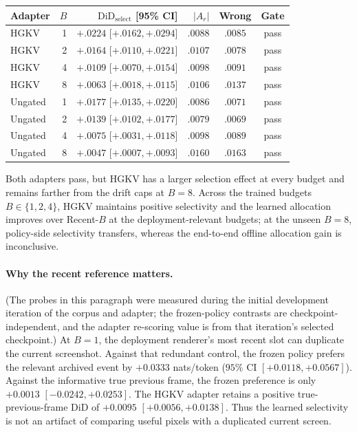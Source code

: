 \documentclass[letterpaper]{article} %
\newcommand{\hgkv}{\textsc{HGKV}}
\begin{document}
\begin{center}
\centering
{\small
\setlength{\tabcolsep}{2.3pt}
\begin{tabular}{@{}lrrrcc@{}}
\toprule
Adapter & $B$ & $\mathrm{DiD}_{\mathrm{select}}$ [95\% CI] &
$|A_r|$ & Wrong & Gate \\
\midrule
\hgkv & 1 & $+.0224$ [$+.0162,+.0294$] & $.0088$ & $.0085$ & pass \\
\hgkv & 2 & $+.0164$ [$+.0110,+.0221$] & $.0107$ & $.0078$ & pass \\
\hgkv & 4 & $+.0109$ [$+.0070,+.0154$] & $.0098$ & $.0091$ & pass \\
\hgkv & 8 & $+.0063$ [$+.0018,+.0115$] & $.0106$ & $.0137$ & pass \\
\midrule
Ungated & 1 & $+.0177$ [$+.0135,+.0220$] & $.0086$ & $.0071$ & pass \\
Ungated & 2 & $+.0139$ [$+.0102,+.0177$] & $.0079$ & $.0069$ & pass \\
Ungated & 4 & $+.0075$ [$+.0031,+.0118$] & $.0098$ & $.0089$ & pass \\
Ungated & 8 & $+.0047$ [$+.0007,+.0093$] & $.0160$ & $.0163$ & pass \\
\bottomrule
\end{tabular}
}
\label{tab:s-gates}
\end{center}

Both adapters pass, but \hgkv{} has a larger selection effect at every budget
and remains farther from the drift caps at $B{=}8$. Across the trained
budgets $B\in\{1,2,4\}$, \hgkv{} maintains positive selectivity and the
learned allocation improves over Recent-$B$ at the deployment-relevant
budgets; at the unseen $B{=}8$, policy-side selectivity transfers, whereas
the end-to-end offline allocation gain is inconclusive.

\paragraph{Why the recent reference matters.}
(The probes in this paragraph were measured during the initial development
iteration of the corpus and adapter; the frozen-policy contrasts are
checkpoint-independent, and the adapter re-scoring value is from that
iteration's selected checkpoint.)
At $B{=}1$, the deployment renderer's most recent slot can duplicate the
current screenshot. Against that redundant control, the frozen policy prefers
the relevant archived event by $+0.0333$ nats/token
($95\%$ CI $[+0.0118,+0.0567]$). Against the informative true previous frame,
the frozen preference is only $+0.0013$ $[-0.0242,+0.0253]$. The \hgkv{}
adapter retains a positive true-previous-frame DiD of
$+0.0095$ $[+0.0056,+0.0138]$. Thus the learned selectivity is not an artifact
of comparing useful pixels with a duplicated current screen.
\end{document}
